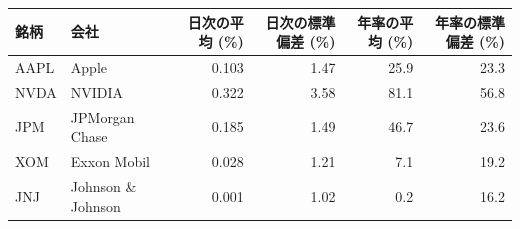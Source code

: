 \begin{tabular}{llrrrr}
\toprule
銘柄 & 会社 & 日次の平均 (\%) & 日次の標準偏差 (\%) & 年率の平均 (\%) & 年率の標準偏差 (\%) \\
\midrule
AAPL & Apple & 0.103 & 1.47 & 25.9 & 23.3 \\
NVDA & NVIDIA & 0.322 & 3.58 & 81.1 & 56.8 \\
JPM & JPMorgan Chase & 0.185 & 1.49 & 46.7 & 23.6 \\
XOM & Exxon Mobil & 0.028 & 1.21 & 7.1 & 19.2 \\
JNJ & Johnson \& Johnson & 0.001 & 1.02 & 0.2 & 16.2 \\
\bottomrule
\end{tabular}
